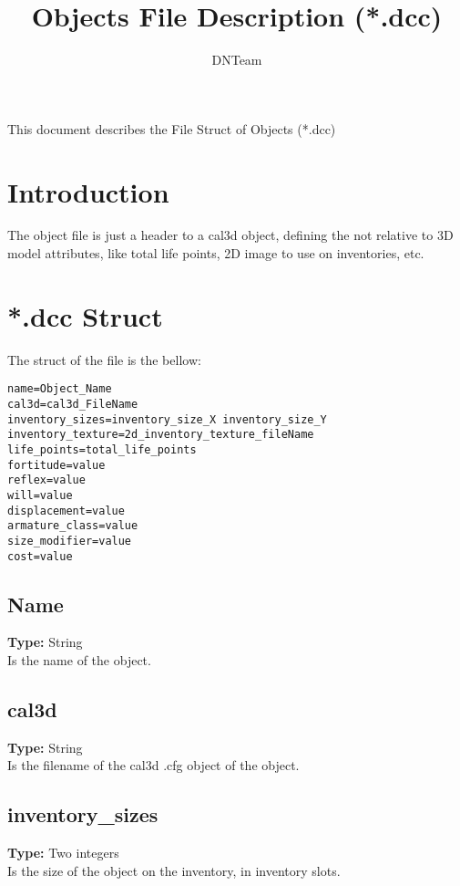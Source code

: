 \documentclass[letterpaper,12pt]{article}
\begin{document}
\title{Objects File Description (*.dcc)}

\author{
DNTeam
}

\maketitle

\abstract
{
   \begin{center}
      This document describes the File Struct of Objects (*.dcc)
   \end{center}
}

\newpage

\tableofcontents

\newpage


\section{Introduction}

The object file is just a header to a cal3d object, defining the not relative
to 3D model attributes, like total life points, 2D image to use on inventories,
etc.

\section{*.dcc Struct}

The struct of the file is the bellow:

\begin{verbatim}
name=Object_Name
cal3d=cal3d_FileName
inventory_sizes=inventory_size_X inventory_size_Y
inventory_texture=2d_inventory_texture_fileName
life_points=total_life_points
fortitude=value
reflex=value
will=value
displacement=value
armature_class=value
size_modifier=value
cost=value
\end{verbatim}

\subsection{Name}
{\bf Type:} String\\
Is the name of the object.

\subsection{cal3d}
{\bf Type:} String\\
Is the filename of the cal3d .cfg object of the object.

\subsection{inventory\_sizes}
{\bf Type:} Two integers\\
Is the size of the object on the inventory, in inventory slots.
\end{document}
